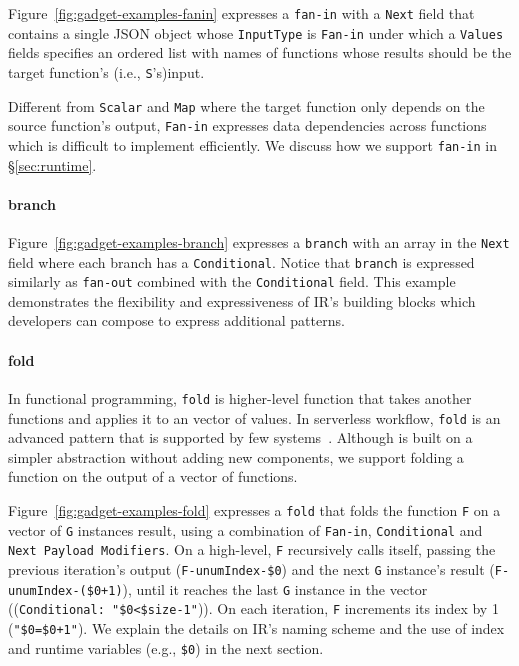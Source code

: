 Figure~\ref{fig:gadget-examples-fanin} expresses a \texttt{fan-in} with a
\texttt{Next} field that contains a single JSON object whose
\texttt{InputType} is \texttt{Fan-in} under which a \texttt{Values} fields
specifies an ordered list with names of functions whose results should be the
target function's (i.e., \texttt{S}'s)input.

Different from \texttt{Scalar} and \texttt{Map} where the target function only
depends on the source function's output, \texttt{Fan-in} expresses data
dependencies across functions which is difficult to implement efficiently. We
discuss how we support \texttt{fan-in} in \S\ref{sec:runtime}.

\paragraph{branch}


Figure~\ref{fig:gadget-examples-branch} expresses a \texttt{branch} with an
array in the \texttt{Next} field where each branch has a \texttt{Conditional}.
Notice that \texttt{branch} is expressed similarly as \texttt{fan-out}
combined with the \texttt{Conditional} field. This example demonstrates the
flexibility and expressiveness of \name{} IR's building blocks which
developers can compose to express additional patterns.

\paragraph{fold}

In functional programming, \texttt{fold} is higher-level function that takes
another functions and applies it to an vector of values. In serverless
workflow, \texttt{fold} is an advanced pattern that is supported by few
systems~\cite{azure-functions}. Although \name{} is built on a simpler
abstraction without adding new components, we support folding a function on
the output of a vector of functions.

Figure~\ref{fig:gadget-examples-fold} expresses a \texttt{fold} that folds the
function \texttt{F} on a vector of \texttt{G} instances result, using a
combination of \texttt{Fan-in}, \texttt{Conditional} and \texttt{Next Payload
Modifiers}. On a high-level, \texttt{F} recursively calls itself, passing the
previous iteration's output (\texttt{F-unumIndex-\$0}) and the next \texttt{G}
instance's result (\texttt{F-unumIndex-(\$0+1)}), until it reaches the last
\texttt{G} instance in the vector ((\texttt{Conditional: "\$0<\$size-1"})). On
each iteration, \texttt{F} increments its index by 1 (\texttt{"\$0=\$0+1"}).
We explain the details on \name{} IR's naming scheme and the use of index and
runtime variables (e.g., \texttt{\$0}) in the next section.


